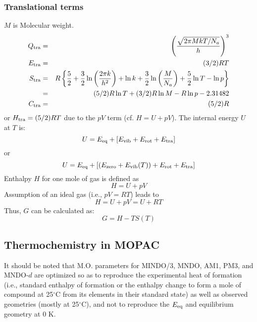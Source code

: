 \subsubsection{Translational terms}
$M$ is Molecular weight.
\begin{eqnarray}
Q_{\rm tra} & = & \left( \frac{\sqrt{2\pi MkT/N_a}}{h}\right)^3
\nonumber\label{eq19} \\
E_{\rm tra} & = & (3/2)RT                            \nonumber\label{eq20} \\
S_{\rm tra} & = & R\left\{ \frac{5}{2} +
\frac{3}{2}\ln\left(\frac{2\pi k}{h^2}\right) + \ln k +
\frac{3}{2}\ln\left(\frac{M}{N_a}\right) + \frac{5}{2}\ln T - \ln p \right\}
\nonumber\label{eq21} \\
            & = & (5/2)R\ln T + (3/2)R\ln M - R\ln p - 2.31482 \nonumber\label{eq22}\\
C_{\rm tra} & = & (5/2)R                              \nonumber\label{eq23}
\end{eqnarray}
or  $H_{\rm tra} = (5/2)RT$  due to the $pV$ term (cf.  $H = U + pV$).
The internal energy $U$ at $T$ is:
\begin{equation}
U = E_{\rm eq} + [E_{\rm vib} + E_{\rm rot} + E_{\rm tra}] \nonumber\label{eq24}
\end{equation}
or
\begin{equation}
U = E_{\rm eq} + [(E_{\rm zero} + E_{\rm vib}(T))
  + E_{\rm rot} + E_{\rm tra}]  \label{eq25}
\end{equation}
Enthalpy $H$ for one mole of gas is defined as
\begin{equation}
H = U + pV     \label{eq26}
\end{equation}
Assumption of an ideal gas (i.e.,  $pV = RT$) leads to
\begin{equation}
H = U + pV = U + RT  \label{eq27}
\end{equation}
Thus,  $G$ can be calculated as:
\begin{equation}
           G = H - T S(T) \label{eq28}
\end{equation}

\subsection{Thermochemistry in MOPAC}
 
It should be noted that M.O. parameters for MINDO/3,  MNDO,  AM1, PM3, and
MNDO-$d$  are optimized so as to reproduce the experimental  heat of formation
(i.e., standard enthalpy of formation or the enthalpy change to  form  a mole
of  compound  at  25$^\circ$C from its elements in their standard state) as
well as observed geometries (mostly at 25$^\circ$C), and  not to reproduce the
$E_{\rm eq}$ and equilibrium geometry at 0 K.

